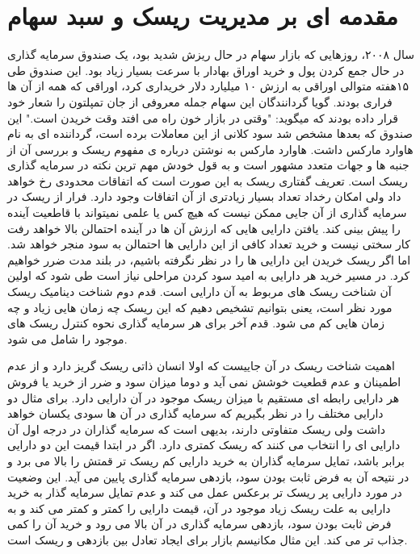 \documentclass[a4paper,titlepage,12pt,fleqn,oneside]{report}
\begin{document}
\section{مقدمه ای بر مدیریت ریسک و سبد سهام}
سال ۲۰۰۸، روزهایی که بازار سهام در حال ریزش شدید بود، یک صندوق سرمایه گذاری در حال جمع کردن پول و خرید اوراق بهادار با سرعت بسیار زیاد بود. این صندوق طی ۱۵هفته متوالی اوراقی به ارزش ۱۰ میلیارد دلار خریداری کرد، اوراقی که همه از آن ها فراری بودند. گویا گردانندگان این سهام جمله معروفی از جان تمپلتون را شعار خود قرار داده بودند که میگوید: "وقتی در بازار خون راه می افتد وقت خریدن است."
این صندوق که بعدها مشخص شد سود کلانی از این معاملات برده است، گرداننده ای به نام هاوارد مارکس داشت. هاوارد مارکس به نوشتن درباره ی مفهوم ریسک و بررسی آن از جنبه ها و جهات متعدد مشهور است و به قول خودش مهم ترین نکته در سرمایه گذاری ریسک است.  تعریف گفتاری ریسک به این صورت است که اتفاقات محدودی رخ خواهد داد ولی امکان رخداد تعداد بسیار زیادتری از آن اتفاقات وجود دارد. فرار از ریسک در سرمایه گذاری از آن جایی ممکن نیست که هیچ کس یا علمی نمیتواند با قاطعیت آینده را پیش بینی کند. یافتن دارایی هایی که ارزش آن ها در آینده احتمالن بالا خواهد رفت کار سختی نیست و خرید تعداد کافی از این دارایی ها احتمالن به سود منجر خواهد شد. اما اگر ریسک خریدن این دارایی ها را در نظر نگرفته باشیم، در بلند مدت ضرر خواهیم کرد.   در مسیر خرید هر دارایی به امید سود کردن مراحلی نیاز است طی شود که اولین آن شناخت ریسک های مربوط به آن دارایی است. قدم دوم شناخت دینامیک ریسک مورد نظر است، یعنی بتوانیم تشخیص دهیم که این ریسک چه زمان هایی زیاد و چه زمان هایی کم می شود. قدم آخر برای هر سرمایه گذاری نحوه کنترل ریسک های موجود را شامل می شود. 

اهمیت شناخت ریسک در آن جاییست که اولا انسان ذاتی ریسک گریز دارد و از عدم اطمینان و عدم قطعیت خوشش نمی آید و دوما میزان سود و ضرر از خرید یا فروش هر دارایی رابطه ای مستقیم با میزان ریسک موجود در آن دارایی دارد. برای مثال دو دارایی مختلف را در نظر بگیریم که سرمایه گذاری در آن ها سودی یکسان خواهد داشت ولی ریسک متفاوتی دارند، بدیهی است که سرمایه گذاران در درجه اول آن دارایی ای را انتخاب می کنند که ریسک کمتری دارد. اگر در ابتدا قیمت این دو دارایی برابر باشد، تمایل سرمایه گذاران به خرید دارایی کم ریسک تر قمتش را بالا می برد و در نتیحه آن به فرض ثابت بودن سود، بازدهی سرمایه گذاری پایین می آید. این وضعیت در مورد دارایی پر ریسک تر برعکس عمل می کند و عدم تمایل سرمایه گذار به خرید دارایی به علت ریسک زیاد موجود در آن، قیمت دارایی را کمتر و کمتر می کند و به فرض ثابت بودن سود،  بازدهی سرمایه گذاری در آن بالا می رود و خرید آن را کمی جذاب تر می کند.  این مثال مکانیسم بازار برای ایجاد تعادل بین بازدهی و ریسک است. 
\end{document}

